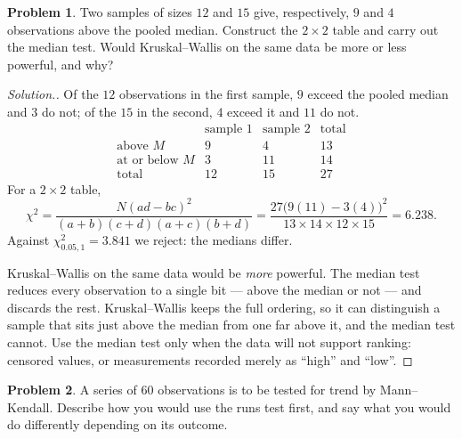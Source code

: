 \documentclass[11pt,a4paper]{article}
\theoremstyle{definition}
\newtheorem{problemx}{Problem}[section]
\newenvironment{problem}{\begin{problemx}}{\end{problemx}}
\newenvironment{solution}
  {\renewcommand{\qedsymbol}{}\begin{proof}[\textit{Solution}.]}
  {\end{proof}}
\begin{document}
\begin{problem}
Two samples of sizes $12$ and $15$ give, respectively, $9$ and $4$ observations
above the pooled median. Construct the $2\times 2$ table and carry out the median
test. Would Kruskal--Wallis on the same data be more or less powerful, and why?
\end{problem}

\begin{solution}
Of the $12$ observations in the first sample, $9$ exceed the pooled median and
$3$ do not; of the $15$ in the second, $4$ exceed it and $11$ do not.
$$\begin{array}{l|cc|c}
 & \text{sample 1} & \text{sample 2} & \text{total}\\\hline
\text{above } M & 9 & 4 & 13\\
\text{at or below } M & 3 & 11 & 14\\\hline
\text{total} & 12 & 15 & 27
\end{array}$$
For a $2\times 2$ table,
$$\chi^{2} = \dfrac{N(ad - bc)^{2}}{(a+b)(c+d)(a+c)(b+d)}
= \dfrac{27\big(9(11) - 3(4)\big)^{2}}{13 \times 14 \times 12 \times 15}
= 6.238 .$$
Against $\chi^{2}_{0.05,1} = 3.841$ we reject: the medians differ.

Kruskal--Wallis on the same data would be \emph{more} powerful. The median test
reduces every observation to a single bit --- above the median or not --- and
discards the rest. Kruskal--Wallis keeps the full ordering, so it can distinguish
a sample that sits just above the median from one far above it, and the median
test cannot. Use the median test only when the data will not support ranking:
censored values, or measurements recorded merely as ``high'' and ``low''.
\end{solution}


\begin{problem}
A series of $60$ observations is to be tested for trend by Mann--Kendall. Describe
how you would use the runs test first, and say what you would do differently
depending on its outcome.
\end{problem}
\end{document}
